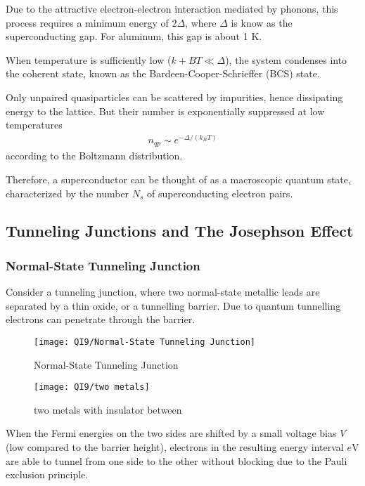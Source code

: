 Due to the attractive electron-electron interaction mediated by phonons, this process requires a minimum energy of $2\Delta$, where $\Delta$ is know as the superconducting gap. For aluminum, this gap is about 1 K. 

When temperature is sufficiently low ($k+B T \ll \Delta$), the system condenses into the coherent state, known as the Bardeen-Cooper-Schrieffer (BCS) state. 

Only unpaired quasiparticles can be scattered by impurities,
hence dissipating energy to the lattice. But their number is
exponentially suppressed at low temperatures
\begin{align*}
    n_{qp}\sim e^{-\Delta / (k_B T)}
\end{align*}
according to the Boltzmann distribution.

Therefore, a superconductor can be thought of as a macroscopic quantum state, characterized by the number $N_s$ of superconducting electron pairs.


\subsection{Tunneling Junctions and The Josephson Effect}

\subsubsection{Normal-State Tunneling Junction}

Consider a tunneling junction, where two normal-state metallic leads are separated by a thin oxide, or a tunnelling barrier. Due to quantum tunnelling electrons can penetrate through the barrier.
\begin{figure}[H]
    \centering
    \texttt{[image: QI9/Normal-State Tunneling Junction]}
    \caption{Normal-State Tunneling Junction}
\end{figure}

\begin{figure}[H]
    \centering
    \texttt{[image: QI9/two metals]}
    \caption{two metals with insulator between}
\end{figure}

When the Fermi energies on the two sides are shifted by a small voltage bias $V$ (low compared to the barrier height), electrons in the resulting energy interval $e$V are able to tunnel from one side to the other without blocking due to the Pauli exclusion principle. 

